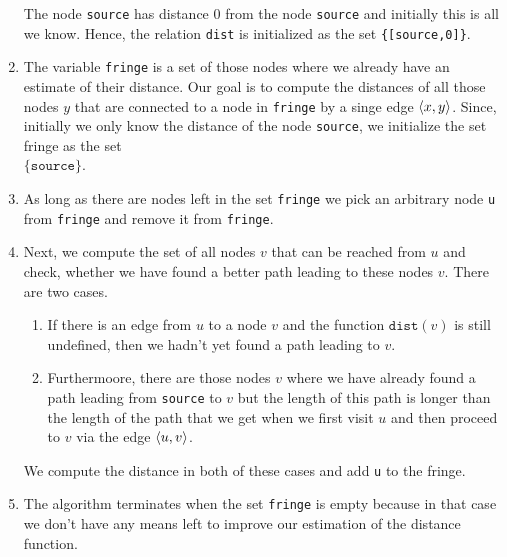 \begin{enumerate}
      The node \texttt{source} has distance $0$ from the node \texttt{source} and initially this is
      all we know.  Hence, the relation \texttt{dist} is initialized as the set \texttt{\{[source,0]\}}.
\item The variable \texttt{fringe} is a set of those nodes where we already have an estimate of
      their distance.  Our goal is to compute the distances of all those nodes $y$ that are
      connected to a node in \texttt{fringe} by a singe edge $\pair(x,y)$.
      Since, initially we only know the distance of the node \texttt{source}, we initialize the set
      fringe as the set
      \\[0.2cm]
      \hspace*{1.3cm}
      $\{ \mathtt{source} \}$.
\item As long as there are nodes left in the set \texttt{fringe} we pick an arbitrary node
      \texttt{u} from \texttt{fringe} and remove it from \texttt{fringe}. 
\item Next, we compute the set of all nodes $v$ that can be reached from $u$ and check, whether we
      have found a better path leading to these nodes $v$.
      There are two cases.
      \begin{enumerate}
      \item If there is an edge from $u$ to a node $v$ and the function $\texttt{dist}(v)$ is still
            undefined, then we hadn't yet found a path leading to $v$.
      \item Furthermoore, there are those nodes $v$ where we have already found a path leading from
            \texttt{source} to $v$ but the length of this path is longer than the length of the path
            that we get when we first visit $u$ and then proceed to $v$ via the edge $\pair(u,v)$.
      \end{enumerate}
      We compute the distance in both of these cases and add \texttt{u} to the fringe.
\item The algorithm terminates when the set \texttt{fringe} is empty because in that case we don't
      have any means left to improve our estimation of the distance function.
\end{enumerate}

